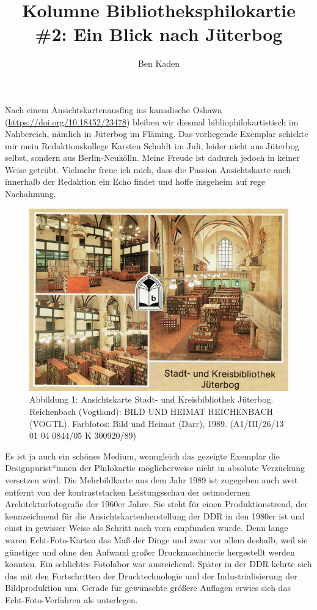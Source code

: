 \documentclass[a4paper,
fontsize=11pt,
oneside,
numbers=noperiodatend,
parskip=half-,
bibliography=totoc,
final
]{scrartcl}
\title{\LARGE{Kolumne Bibliotheksphilokartie \#2: Ein Blick nach Jüterbog}}%
\author{Ben Kaden} %
\date{}
\begin{document}
\maketitle
\thispagestyle{fancyplain} 


Nach einem Ansichtskartenausflug ins kanadische Oshawa
(\url{https://doi.org/10.18452/23478}) bleiben wir diesmal
bibliophilokartistisch im Nahbereich, nämlich in Jüterbog im Fläming.
Das vorliegende Exemplar schickte mir mein Redaktionskollege Karsten
Schuldt im Juli, leider nicht aus Jüterbog selbst, sondern aus
Berlin-Neukölln. Meine Freude ist dadurch jedoch in keiner Weise
getrübt. Vielmehr freue ich mich, dass die Passion Ansichtskarte auch
innerhalb der Redaktion ein Echo findet und hoffe insgeheim auf rege
Nachahmung.

\begin{figure}
\centering
\includegraphics[width=.7\textwidth]{img/Abb1.jpg}
\caption{Abbildung 1: Ansichtskarte Stadt- und Kreisbibliothek Jüterbog.
Reichenbach (Vogtland): BILD UND HEIMAT REICHENBACH (VOGTL). Farbfotos:
Bild und Heimat (Darr), 1989. (A1/III/26/13 01 04 0844/05 K 300920/89)}
\end{figure}

Es ist ja auch ein schönes Medium, wenngleich das gezeigte Exemplar die
Designpurist*innen der Philokartie möglicherweise nicht in absolute
Verzückung versetzen wird. Die Mehrbildkarte aus dem Jahr 1989 ist
zugegeben auch weit entfernt von der kontraststarken Leistungsschau der
ostmodernen Architekturfotografie der 1960er Jahre. Sie steht für einen
Produktionstrend, der kennzeichnend für die Ansichtskartenherstellung
der DDR in den 1980er ist und einst in gewisser Weise als Schritt nach
vorn empfunden wurde. Denn lange waren Echt-Foto-Karten das Maß der
Dinge und zwar vor allem deshalb, weil sie günstiger und ohne den
Aufwand großer Druckmaschinerie hergestellt werden konnten. Ein
schlichtes Fotolabor war ausreichend. Später in der DDR kehrte sich das
mit den Fortschritten der Drucktechnologie und der Industrialisierung
der Bildproduktion um. Gerade für gewünschte größere Auflagen erwies
sich das Echt-Foto-Verfahren als unterlegen.
\end{document}
